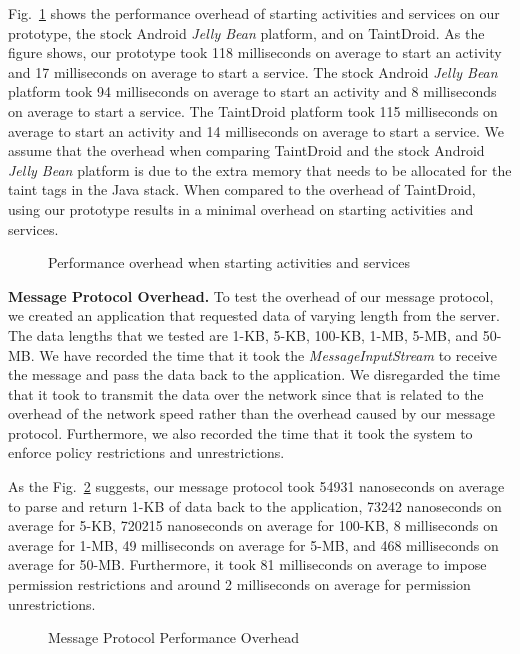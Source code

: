 Fig.~\ref{fig:component} shows the performance overhead of starting activities and services on
our prototype, the stock Android \textit{Jelly Bean} platform, and on TaintDroid.
As the figure shows, our prototype took 118 milliseconds on average to
start an activity and 17 milliseconds on average to start a service.  The
stock Android \textit{Jelly Bean} platform took 94 milliseconds on average
to start an activity and 8 milliseconds on average to start a service.  The
TaintDroid platform took 115 milliseconds on average to start an activity
and 14 milliseconds on average to start a service.  We assume that the
overhead when comparing TaintDroid and the stock Android \textit{Jelly Bean}
platform is due to the extra memory that needs to be allocated for the 
taint tags in the Java stack.  When compared to the overhead of TaintDroid,
using our prototype results in a minimal overhead on starting activities and services.

\begin{figure}[ht]
\centering
{}
\caption{Performance overhead when starting activities and services}
\label{fig:component}
\end{figure}

\textbf{Message Protocol Overhead.}  To test the overhead of our message protocol,
we created an application that requested data of varying length from the server.
The data lengths that we tested are 1-KB, 5-KB, 100-KB, 1-MB, 5-MB, and 50-MB.
We have recorded the time that it took the \textit{MessageInputStream} to receive
the message and pass the data back to the application.  We disregarded the time
that it took to transmit the data over the network since that is related
to the overhead of the network speed rather than the overhead caused by
our message protocol.  Furthermore, we also recorded the time that it
took the system to enforce policy restrictions and unrestrictions.

As the Fig.~\ref{fig:performance} suggests, our message
protocol took 54931 nanoseconds on average to parse and return 1-KB of
data back to the application, 73242 nanoseconds on average for 5-KB, 
720215 nanoseconds on average for 100-KB, 8 milliseconds on average
for 1-MB, 49 milliseconds on average for 5-MB, and 468 milliseconds
on average for 50-MB.  Furthermore, it took 81 milliseconds on average
to impose permission restrictions and around 2 milliseconds on average
for permission unrestrictions.

\begin{figure}[ht]
\centering
{}
\caption{Message Protocol Performance Overhead}
\label{fig:performance}
\end{figure}

